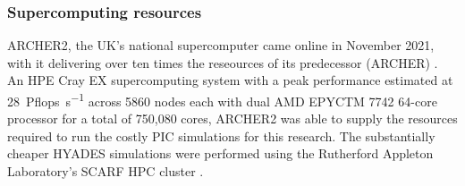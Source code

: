 \subsubsection{Supercomputing resources}\label{sec:intro-archer}
ARCHER2, the UK's national supercomputer came online in November 2021, with it delivering over ten times the reseources of its predecessor (ARCHER) \cite{ARCHER2}. An HPE Cray EX supercomputing system with a peak performance estimated at \qty{28}{Pflops.s^{-1}} across 5860 nodes each with dual AMD EPYCTM 7742 64-core processor for a total of 750,080 cores, ARCHER2 was able to supply the resources required to run the costly PIC simulations for this research. The substantially cheaper HYADES simulations were performed using the Rutherford Appleton Laboratory's SCARF \ac{HPC} cluster \cite{SCARFOverview}.


